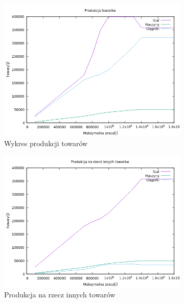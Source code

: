 \documentclass{article}
\begin{document}
\begin{figure}[H]
  \centering
  \begin{subfigure}[b]{0.4\linewidth}
    \includegraphics[width=\linewidth]{output/produkcja.png}
    \caption{Wykres produkcji towarów}
    \label{fig:produkcja}
  \end{subfigure}
  \begin{subfigure}[b]{0.4\linewidth}
    \includegraphics[width=\linewidth]{output/produkcja_na_rzecz.png}
    \caption{Produkcja na rzecz innych towarów}
    \label{fig:produkcja_na_rzecz}
  \end{subfigure}
  \begin{subfigure}[b]{0.4\linewidth}

\end{subfigure}
\end{figure}
\end{document}
